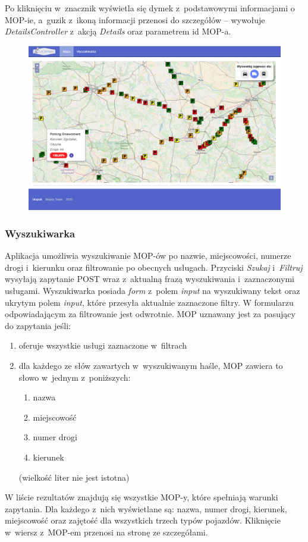 Po kliknięciu w~znacznik wyświetla się dymek z~podstawowymi informacjami o MOP-ie, a~guzik z~ikoną informacji przenosi do szczegółów -- wywołuje \textit{DetailsController} z~akcją \textit{Details} oraz parametrem id MOP-a.

\begin{figure}[!htb]
\centering
\includegraphics[width=\textwidth]{images/mopsik_www/map.png}
\label{mopsik_www_map}
\end{figure}

\subsubsection{Wyszukiwarka}
Aplikacja umożliwia wyszukiwanie MOP-ów po nazwie, miejscowości, numerze drogi i~kierunku oraz filtrowanie po obecnych usługach. Przyciski \textit{Szukaj} i~\textit{Filtruj} wysyłają zapytanie POST wraz z~aktualną frazą wyszukiwania i~zaznaczonymi usługami.
Wyszukiwarka posiada \textit{form} z~polem \textit{input} na wyszukiwany tekst oraz ukrytym polem \textit{input}, które przesyła aktualnie zaznaczone filtry. W formularzu odpowiadającym za filtrowanie jest odwrotnie.  
MOP uznawany jest za pasujący do zapytania jeśli:
\begin{enumerate}
\item oferuje wszystkie usługi zaznaczone w~filtrach
\item dla każdego ze słów zawartych w~wyszukiwanym haśle, MOP zawiera to słowo w~jednym z~poniższych:
\begin{enumerate}
\item nazwa
\item miejscowość
\item numer drogi
\item kierunek
\end{enumerate}
(wielkość liter nie jest istotna)
\end{enumerate}
W liście rezultatów znajdują się wszystkie MOP-y, które spełniają warunki zapytania. Dla każdego z~nich wyświetlane są: nazwa, numer drogi, kierunek, miejscowość oraz zajętość dla wszystkich trzech typów pojazdów. Kliknięcie w~wiersz z~MOP-em przenosi na stronę ze szczegółami.


